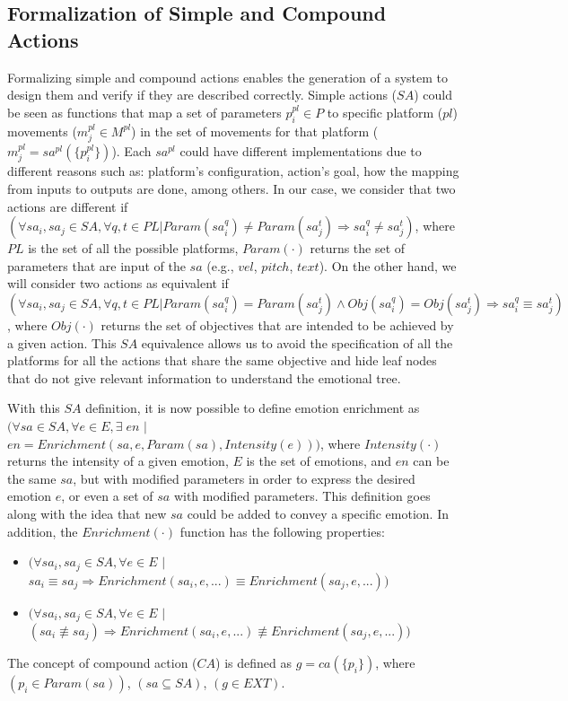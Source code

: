 \subsection{Formalization of Simple and Compound Actions}
Formalizing simple and compound actions enables the generation of a system to design them and verify if they are described correctly. Simple actions ($SA$) could be seen as functions that map a set of parameters $p^{pl}_{i} \in P$ to specific platform ($pl$) movements ($m^{pl}_{j}\in M^{pl}$) in the set of movements for that platform ($m^{pl}_{j} =sa^{pl}(\lbrace p^{pl}_{i} \rbrace)$). Each $sa^{pl}$ could have different implementations due to different reasons such as: platform's configuration, action's goal, how the mapping from inputs to outputs are done, among others. 
In our case, we consider that two actions are different if $(\forall sa_{i}, sa_{j} \in SA, \forall q, t \in PL | Param( sa_{i}^q ) \neq Param( sa_{j}^t )\Rightarrow sa_{i}^q \neq sa_{j}^t)$, 
where $PL$ is the set of all the possible platforms, $Param(\cdot)$ returns the set of parameters that are input of the $sa$ (e.g., $vel$, $pitch$, $text$). 
On the other hand, we will consider two actions as equivalent if $(\forall sa_{i}, sa_{j} \in SA , \forall q, t \in PL | Param( sa_{i}^q ) = Param(sa_{j}^t ) \wedge Obj(sa_{i}^q) = Obj(sa_{j}^t) \Rightarrow sa_{i}^q \equiv sa_{j}^t)$,  
where $Obj(\cdot)$ returns the set of objectives that are intended to be achieved by a given action. This $SA$ equivalence allows us to avoid the specification of all the platforms for all the actions that share the same objective and hide leaf nodes that do not give relevant information to understand the emotional tree.

With this $SA$ definition, it is now possible to define emotion enrichment as $ (\forall sa \in SA, \forall e \in E, \exists \; en$ $|$ $en=Enrichment(sa,e,Param(sa), Intensity(e)))$, where $Intensity(\cdot)$ returns the intensity of a given emotion, $E$ is the set of emotions, and $en$ can be the same $sa$, but with modified parameters in order to express the desired emotion $e$, or even a set of $sa$ with modified parameters. This definition goes along with the idea that new $sa$ could be added to convey a specific emotion. In addition, the $Enrichment(\cdot)$ function has the following properties:
\begin{itemize}
	\item $(\forall sa_{i},sa_{j} \in SA, \forall e \in E$ $|$ $sa_{i} \equiv sa_{j} \Rightarrow Enrichment(sa_{i},e,...) \equiv Enrichment(sa_{j},e,...))$
	\item $(\forall sa_{i},sa_{j} \in SA, \forall e \in E$ $|$ $(sa_{i} \not\equiv sa_{j}) \Rightarrow Enrichment(sa_{i},e,...) \not \equiv Enrichment(sa_{j},e,...))$
\end{itemize}

The concept of compound action ($CA$) is defined as $g = ca(\{p_{i}\})$, where $(p_{i} \in Param(sa))$, $(sa \subseteq SA)$, $(g \in EXT)$.
